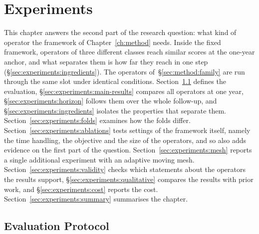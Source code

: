 \cleardoubleoddpage%
\chapter{Experiments}
\label{ch:experiments}



This chapter answers the second part of the research question: what kind
of operator the framework of Chapter~\ref{ch:method} needs. Inside the
fixed framework, operators of three different classes reach similar scores
at the one-year anchor, and what separates them is how far they reach in
one step (\S\ref{sec:experiments:ingredients}). The operators
of~\S\ref{sec:method:family} are run through the same slot under identical
conditions. Section~\ref{sec:experiments:protocol} defines the evaluation,
\S\ref{sec:experiments:main-results} compares all operators at one year,
\S\ref{sec:experiments:horizon} follows them over the whole follow-up, and
\S\ref{sec:experiments:ingredients} isolates the properties that separate
them. Section~\ref{sec:experiments:folds} examines how the folds differ.
Section~\ref{sec:experiments:ablations} tests settings of the framework itself,
namely the time handling, the objective and the size of the operators, and
so also adds evidence on the first part of the question.
Section~\ref{sec:experiments:mesh} reports a single additional experiment
with an adaptive moving mesh.
Section~\ref{sec:experiments:validity} checks which statements about the
operators the results support, \S\ref{sec:experiments:qualitative} compares the
results with prior work, and \S\ref{sec:experiments:cost} reports the cost.
Section~\ref{sec:experiments:summary} summarises the chapter.

\section{Evaluation Protocol}
\label{sec:experiments:protocol}

